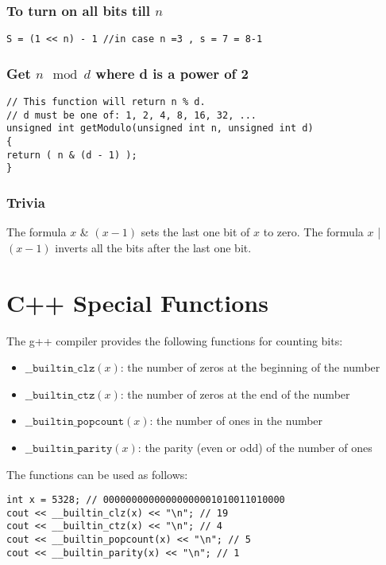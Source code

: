 \documentclass[twoside,12pt,a4paper,english]{book}
\theoremstyle{definition}
\theoremstyle{problemstyle}
\theoremstyle{problemstyle}
\theoremstyle{problemstyle}
\begin{document}
\subsubsection{To turn on all bits till $n$}
\begin{lstlisting}
S = (1 << n) - 1 //in case n =3 , s = 7 = 8-1
\end{lstlisting}
\subsubsection{Get $n \mod d$ where d is a power of 2}
\begin{lstlisting}
// This function will return n % d.
// d must be one of: 1, 2, 4, 8, 16, 32, ...
unsigned int getModulo(unsigned int n, unsigned int d)
{
return ( n & (d - 1) );
}
\end{lstlisting}
\subsubsection{Trivia}
The formula $x$ \& $(x-1)$ sets the last
one bit of $x$ to zero.
The formula $x$ | $(x-1)$
inverts all the bits after the last one bit.
\section{C++ Special Functions}
The g++ compiler provides the following
functions for counting bits:

\begin{itemize}
\item
$\texttt{\_\_builtin\_clz}(x)$:
the number of zeros at the beginning of the number
\item
$\texttt{\_\_builtin\_ctz}(x)$:
the number of zeros at the end of the number
\item
$\texttt{\_\_builtin\_popcount}(x)$:
the number of ones in the number
\item
$\texttt{\_\_builtin\_parity}(x)$:
the parity (even or odd) of the number of ones
\end{itemize}
\begin{samepage}

The functions can be used as follows:
\begin{lstlisting}
int x = 5328; // 00000000000000000001010011010000
cout << __builtin_clz(x) << "\n"; // 19
cout << __builtin_ctz(x) << "\n"; // 4
cout << __builtin_popcount(x) << "\n"; // 5
cout << __builtin_parity(x) << "\n"; // 1
\end{lstlisting}
\end{samepage}
\end{document}
